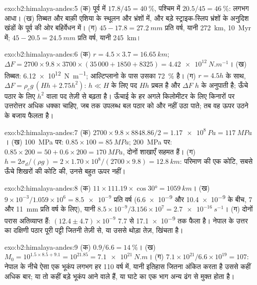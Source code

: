 \begin{solution}{exo:b2:himalaya-andes:5}
(क) पूर्व में $17.8/45 = \qty{40}{\percent}$, पश्चिम में $20.5/45 = \qty{46}{\percent}$:
लगभग आधा। (ख) तिब्बत और बाक़ी एशिया के स्थूलन और भ्रंशों में, और
बड़े स्ट्राइक-स्लिप भ्रंशों के अनुदिश खंडों के पूर्व की ओर बहिर्वेधन में। (ग) $45 - 17.8 =
\qty{27.2}{mm}$ प्रति वर्ष, यानी \qty{272}{km}, \qty{10}{Myr} में; $45 - 20.5 = \qty{24.5}{mm}$ प्रति
वर्ष, यानी \qty{245}{km}।
\end{solution}

\begin{solution}{exo:b2:himalaya-andes:6}
(क) $r = 4.5\times3.7 = \qty{16.65}{km}$; $\Delta F = 2700\times9.8\times3700\times(35\,000 +
1850 + 8325) = \qty{4.42e12}{N.m^{-1}}$। (ख) तिब्बत: \qty{6.12e12}{N.m^{-1}}; आल्टिप्लानो
के पास उसका \qty{72}{\percent} है। (ग) $r = 4.5h$ के साथ, $\Delta F = \rho_c g\,(Hh + 2.75h^2)$:
$h \ll H$ के लिए पद $Hh$ प्रबल है और $\Delta F$ $h$ के अनुपाती है; ऊँचे पठार के लिए
$h^2$ वाला पद तेज़ी से बढ़ता है। ऊँचाई के हर अगले किलोमीटर के लिए किनारों पर उत्तरोत्तर अधिक धक्का चाहिए,
जब तक उपलब्ध बल पठार को और नहीं उठा पाते; तब वह ऊपर उठने के बजाय
फैलता है।
\end{solution}

\begin{solution}{exo:b2:himalaya-andes:7}
(क) $2700\times9.8\times8848.86/2 = \qty{1.17e8}{Pa} = \qty{117}{MPa}$। (ख)
\qty{100}{MPa} पर: $0.85\times100 = \qty{85}{MPa}$; \qty{200}{MPa} पर: $0.85\times200 = 50 +
0.6\times200 = \qty{170}{MPa}$, दोनों शाखाएँ सहमत हैं। (ग) $h = 2\sigma_d/(\rho g) =
2\times1.70\times10^8/(2700\times9.8) = \qty{12.8}{km}$: परिमाण की एक कोटि, सबसे ऊँचे शिखरों की
कोटि की, उनसे बहुत ऊपर नहीं।
\end{solution}

\begin{solution}{exo:b2:himalaya-andes:8}
(क) $11\times111.19\times\cos\ang{30} = \qty{1059}{km}$। (ख) $9\times10^{-3}/1.059\times10^{6}
= \num{8.5e-9}$ प्रति वर्ष (\num{6.6e-9} और \num{10.4e-9} के बीच, 7 और \qty{11}{mm} प्रति वर्ष के लिए),
यानी $8.5\times10^{-9}/3.156\times10^{7} = \qty{2.7e-16}{s^{-1}}$। (ग) दोनों परास
अतिव्याप्त हैं: $(12.4 \pm 4.7) \times 10^{-9}$ 7.7 से \num{17.1e-9} तक फैला है। नेपाल के उत्तर का दक्षिणी पठार
पूरी पट्टी जितनी तेज़ी से, या उससे थोड़ा तेज़, खिंचता है।
\end{solution}

\begin{solution}{exo:b2:himalaya-andes:9}
(क) $0.9/6.6 = \qty{14}{\percent}$। (ख) $M_0 = 10^{1.5\times8.5 + 9.1} = 10^{21.85} =
\qty{7.1e21}{N.m}$। (ग) $7.1\times10^{21}/6.6\times10^{19} = 107$: नेपाल के नीचे ऐसा एक भूकंप लगभग
हर 110 वर्ष में, यानी इतिहास जितना अंकित करता है उससे कहीं अधिक बार; या तो कहीं बड़े भूकंप
आने वाले हैं, या घाटे का एक भाग अन्य ढंग से मुक्त होता है।
\end{solution}

